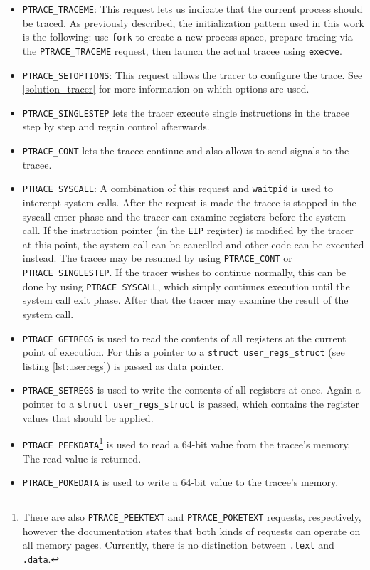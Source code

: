 \documentclass[draft,final]{vutinfth} %
\begin{document}
\begin{itemize}
    \item \texttt{PTRACE\_TRACEME}: This request lets us indicate that the current process should be traced. As previously described, the initialization pattern used in this work is the following: use \texttt{fork} to create a new process space, prepare tracing via the \texttt{PTRACE\_TRACEME} request, then launch the actual tracee using \texttt{execve}.
    \item \texttt{PTRACE\_SETOPTIONS}: This request allows the tracer to configure the trace. See \ref{solution_tracer} for more information on which options are used.
    \item \texttt{PTRACE\_SINGLESTEP} lets the tracer execute single instructions in the tracee step by step and regain control afterwards.
    \item \texttt{PTRACE\_CONT} lets the tracee continue and also allows to send signals to the tracee.
    \item \texttt{PTRACE\_SYSCALL}: A combination of this request and \texttt{waitpid} is used to intercept system calls. After the request is made the tracee is stopped in the syscall enter phase and the tracer can examine registers before the system call. If the instruction pointer (in the \texttt{EIP} register) is modified by the tracer at this point, the system call can be cancelled and other code can be executed instead. The tracee may be resumed by using \texttt{PTRACE\_CONT} or \texttt{PTRACE\_SINGLESTEP}. If the tracer wishes to continue normally, this can be done by using \texttt{PTRACE\_SYSCALL}, which simply continues execution until the system call exit phase. After that the tracer may examine the result of the system call.
    \item \texttt{PTRACE\_GETREGS} is used to read the contents of all registers at the current point of execution. For this a pointer to a \texttt{struct user\_regs\_struct} (see listing \ref{lst:userregs}) is passed as data pointer.
    \item \texttt{PTRACE\_SETREGS} is used to write the contents of all registers at once. Again a pointer to a \texttt{struct user\_regs\_struct} is passed, which contains the register values that should be applied.
    \item \texttt{PTRACE\_PEEKDATA}\footnote{There are also \texttt{PTRACE\_PEEKTEXT} and \texttt{PTRACE\_POKETEXT} requests, respectively, however the documentation states that both kinds of requests can operate on all memory pages. Currently, there is no distinction between \texttt{.text} and \texttt{.data}.} is used to read a 64-bit value from the tracee's memory. The read value is returned.
    \item \texttt{PTRACE\_POKEDATA} is used to write a 64-bit value to the tracee's memory.
\end{itemize}
\end{document}
